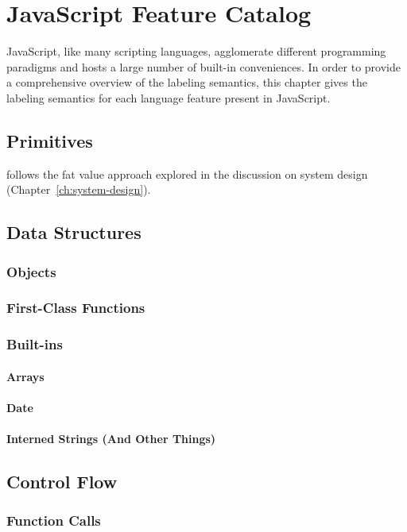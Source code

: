 
\chapter{JavaScript Feature Catalog}

JavaScript, like many scripting languages, agglomerate different programming paradigms and hosts a large number of built-in conveniences.
In order to provide a comprehensive overview of the labeling semantics, this chapter gives the labeling semantics for each language feature present in JavaScript.

\section{Primitives}

\FlowCore follows the fat value approach explored in the discussion on system design (Chapter~\ref{ch:system-design}).


\section{Data Structures}
\subsection{Objects}
\subsection{First-Class Functions}
\subsection{Built-ins}
\subsubsection{Arrays}
\subsubsection{Date}
\subsubsection{Interned Strings (And Other Things)}

\section{Control Flow}
\subsection{Function Calls}

